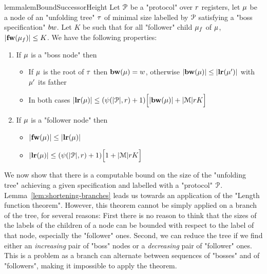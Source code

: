 \begin{restatable}{lemma}{lemBoundSuccessorHeight}
	\label{lem:bound-successor-height}
	Let $\mathcal{P}$ be a "protocol" over $r$ registers, let $\mu$ be a node of an "unfolding tree" $\tau$ of minimal size labelled by $\mathcal{P}$ satisfying a "boss specification" $\bossspec$.
	Let $K$ be such that for all "follower" child $\mu_f$ of $\mu$, $|\mathbf{fw}(\mu_f)| \leq K$.
	We have the following properties:
	
	\begin{enumerate}				
		\item  If $\mu$ is a "boss node" then 
		\begin{itemize}
			\item If $\mu$ is the root of $\tau$ then $\mathbf{bw}(\mu) = w$, otherwise $|\mathbf{bw}(\mu)| \leq |\mathbf{lr}(\mu')|$ with $\mu'$ its father
			
			\item In both cases $|\mathbf{lr}(\mu)| \leq (\psi(|\mathcal{P}|,r) + 1)\Big[ |\mathbf{bw}(\mu)| + |\mathcal{M}|rK \Big]$
		\end{itemize}
	
		\item If $\mu$ is a "follower node" then 
		\begin{itemize}			
			\item $|\mathbf{fw}(\mu)| \leq |\mathbf{lr}(\mu)|$
			
			\item $|\mathbf{lr}(\mu)| \leq (\psi(|\mathcal{P}|,r) +1)\Big[ 1 + |\mathcal{M}|rK \Big]$
			
		\end{itemize}
	\end{enumerate}
\end{restatable}


We now show that there is a computable bound on the size of the "unfolding tree" achieving a given specification and labelled with a "protocol" $\mathcal{P}$. Lemma~\ref{lem:shortening-branches} leads us towards an application of the "Length function theorem". 
However, this theorem cannot be simply applied on a branch of the tree, for several reasons: First there is no reason to think that the sizes of the labels of the children of a node can be bounded with respect to the label of that node, especially the "follower" ones.  Second, we can reduce the tree if we find either an \emph{increasing} pair of "boss" nodes or a \emph{decreasing} pair of "follower" ones. This is a problem as a branch can alternate between sequences of "bosses" and of "followers", making it impossible to apply the theorem.

